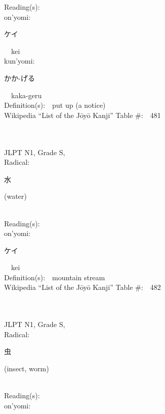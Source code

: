 \begin{multicols}{2}
Reading(s):\ \ \\
{\hspace*{1em}}on'yomi:\ \ \\
{\hspace*{2em}}{\begin{CJK}{UTF8}{min} ケイ \end{CJK}}\ \ kei\ \ \\
{\hspace*{1em}}kun'yomi:\ \ \\
{\hspace*{2em}}{\begin{CJK}{UTF8}{min} かか-げる \end{CJK}}\ \ kaka-geru\ \ \\
Definition(s):\ \ put up (a notice) \\
Wikipedia ``List of the J\=oy\=o Kanji'' Table \#:\ \ 481 \\
\ \ \\
{\fontsize{34pt}{40pt}  }\ \ \\
{JLPT N1, Grade S, \\Radical:\ \ {\begin{CJK}{UTF8}{min} 水 \end{CJK}} (water) } \\
Reading(s):\ \ \\
{\hspace*{1em}}on'yomi:\ \ \\
{\hspace*{2em}}{\begin{CJK}{UTF8}{min} ケイ \end{CJK}}\ \ kei\ \ \\
Definition(s):\ \ mountain stream \\
Wikipedia ``List of the J\=oy\=o Kanji'' Table \#:\ \ 482 \\
\ \ \\
{\fontsize{34pt}{40pt}  }\ \ \\
{JLPT N1, Grade S, \\Radical:\ \ {\begin{CJK}{UTF8}{min} 虫 \end{CJK}} (insect, worm) } \\
Reading(s):\ \ \\
{\hspace*{1em}}on'yomi:\ \ \\

\end{multicols}
